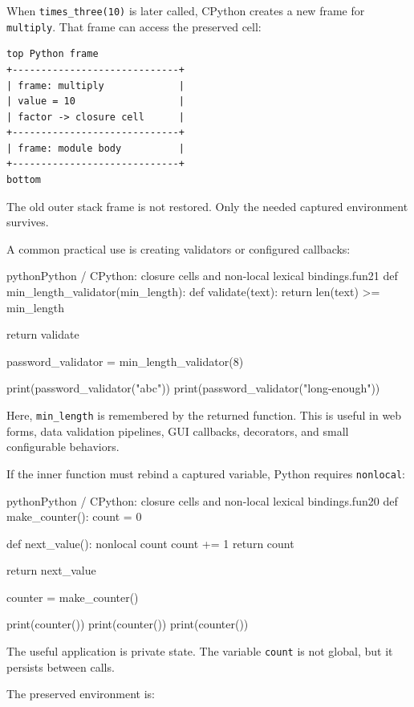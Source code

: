 \documentclass[a4paper,twoside]{report}
\begin{document}
When \texttt{times\_three(10)} is later called, CPython creates a new frame for \texttt{multiply}. That frame can access the preserved cell:

\begin{verbatim}
top Python frame
+-----------------------------+
| frame: multiply             |
| value = 10                  |
| factor -> closure cell      |
+-----------------------------+
| frame: module body          |
+-----------------------------+
bottom
\end{verbatim}

The old outer stack frame is not restored. Only the needed captured environment survives.

A common practical use is creating validators or configured callbacks:

\begin{codebox}[]{python}{Python / CPython: closure cells and non-local lexical bindings.}{fun21}
def min_length_validator(min_length):
    def validate(text):
        return len(text) >= min_length

    return validate


password_validator = min_length_validator(8)

print(password_validator("abc"))
print(password_validator("long-enough"))
\end{codebox}


Here, \texttt{min\_length} is remembered by the returned function. This is useful in web forms, data validation pipelines, GUI callbacks, decorators, and small configurable behaviors.

If the inner function must rebind a captured variable, Python requires \texttt{nonlocal}:

\begin{codebox}[]{python}{Python / CPython: closure cells and non-local lexical bindings.}{fun20}
def make_counter():
    count = 0

    def next_value():
        nonlocal count
        count += 1
        return count

    return next_value


counter = make_counter()

print(counter())
print(counter())
print(counter())
\end{codebox}


The useful application is private state. The variable \texttt{count} is not global, but it persists between calls.

The preserved environment is:
\end{document}

